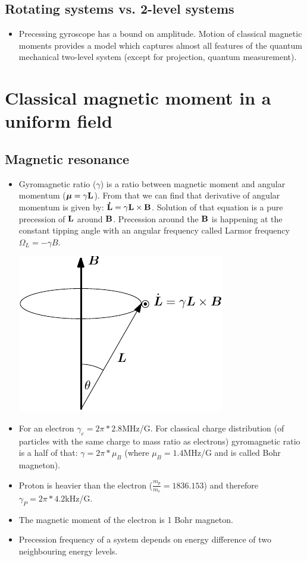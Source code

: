 \documentclass[AtomicOptical1Notes.tex]{subfiles}
\begin{document}
	\subsection{Rotating systems vs. 2-level systems}
		\begin{itemize}
			\item Precessing gyroscope has a bound on amplitude. Motion of classical magnetic moments provides a model which captures almost all features of the quantum mechanical two-level system (except for projection, quantum measurement).
		\end{itemize}
		
\section{Classical magnetic moment in a uniform field}

	\subsection{Magnetic resonance}
		\begin{itemize}
			\item Gyromagnetic ratio ($\gamma$) is a ratio between magnetic moment and angular momentum ($\mbox{\boldmath$ \mu $}=\gamma\mathbf{L}$). From that we can find that derivative of angular momentum is given by: ${\mathbf{\dot{L}}}=\gamma\mathbf{L}\times\mathbf{B}$. Solution of that equation is a pure precession of $\mathbf{L}$ around $\mathbf{B}$. Precession around the $\mathbf{B}$ is happening at the constant tipping angle with an angular frequency called Larmor frequency $\Omega_L=-\gamma B$.
			
			\includegraphics{precession}
			
			\item For an electron $\gamma_e=2\pi*2.8$MHz/G. For classical charge distribution (of particles with the same charge to mass ratio as electrons) gyromagnetic ratio is a half of that: $\gamma=2\pi*\mu_B$ (where $\mu_B = 1.4$MHz/G and is called Bohr magneton).
			\item Proton is heavier than the electron ($\frac{m_p}{m_e}=1836.153$) and therefore $\gamma_P=2\pi*4.2$kHz/G.
			\item The magnetic moment of the electron is 1 Bohr magneton.
			\item Precession frequency of a system depends on energy difference of two neighbouring energy levels. 
		\end{itemize}
		
\end{document}
